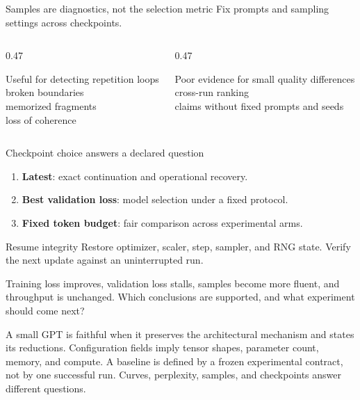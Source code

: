 \documentclass[handout]{beamer}
\begin{document}
\begin{frame}{Samples are diagnostics, not the selection metric}
  Fix prompts and sampling settings across checkpoints.
  \vspace{5pt}
  \begin{columns}[t]
    \begin{column}{0.47\linewidth}
      \begin{block}{Useful for detecting}
        repetition loops\\broken boundaries\\memorized fragments\\loss of coherence
      \end{block}
    \end{column}
    \begin{column}{0.47\linewidth}
      \begin{alertblock}{Poor evidence for}
        small quality differences\\cross-run ranking\\claims without fixed prompts and seeds
      \end{alertblock}
    \end{column}
  \end{columns}
\end{frame}

\begin{frame}{Checkpoint choice answers a declared question}
  \begin{enumerate}
    \setlength{\itemsep}{8pt}
    \item \textbf{Latest}: exact continuation and operational recovery.
    \item \textbf{Best validation loss}: model selection under a fixed protocol.
    \item \textbf{Fixed token budget}: fair comparison across experimental arms.
  \end{enumerate}
  \begin{alertblock}{Resume integrity}
    Restore optimizer, scaler, step, sampler, and RNG state. Verify the next update against an uninterrupted run.
  \end{alertblock}
\end{frame}

  {Training loss improves, validation loss stalls, samples become more fluent, and throughput is unchanged. Which conclusions are supported, and what experiment should come next?}

\takeaways
  {A small GPT is faithful when it preserves the architectural mechanism and states its reductions.}
  {Configuration fields imply tensor shapes, parameter count, memory, and compute.}
  {A baseline is defined by a frozen experimental contract, not by one successful run.}
  {Curves, perplexity, samples, and checkpoints answer different questions.}
\end{document}
